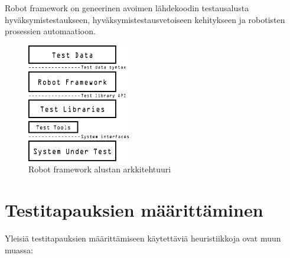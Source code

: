 Robot framework on geneerinen avoimen lähdekoodin testausalusta hyväksymistestaukseen, hyväksymistestausvetoiseen kehitykseen ja robotisten prosessien automaatioon.

\begin{figure}[H]
  \centering
  \includegraphics[width=0.4\textwidth]{assets/robot-architecture.png}
  \caption{Robot framework alustan arkkitehtuuri}
  \label{fig:robot-architecture}
\end{figure}

\section{Testitapauksien määrittäminen}

Yleisiä testitapauksien määrittämiseen käytettäviä heuristiikkoja ovat muun muassa:


